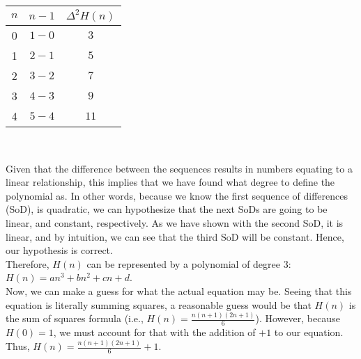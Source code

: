 \documentclass{article}
\begin{document}
\begin{enumerate}
\begin{enumerate}
\begin{multicols}{3}
                \columnbreak
                \begin{center}
                    \begin{tabular}{c|c|c}
                        $n$ & $n-1$ & \(\Delta^2 H(n)\) \\
                        \hline
                        0 & $1-0$ & $3$ \\
                        1 & $2-1$ & $5$ \\
                        2 & $3-2$ & $7$ \\
                        3 & $4-3$ & $9$ \\
                        4 & $5-4$ & $11$ \\
                    \end{tabular} \\
                \end{center}
                
            \end{multicols}

            Given that the difference between the sequences results in numbers equating to a linear relationship, this implies that we have found what degree to define the polynomial as. In other words, because we know the first sequence of differences (SoD), is quadratic, we can hypothesize that the next SoDs are going to be linear, and constant, respectively. As we have shown with the second SoD, it is linear, and by intuition, we can see that the third SoD will be constant. Hence, our hypothesis is correct. \\
            
            Therefore, $H(n)$ can be represented by a polynomial of degree 3: \\ 
            $H(n) = an^3 + bn^2 + cn + d$. \\

            Now, we can make a guess for what the actual equation may be. Seeing that this equation is literally summing squares, a reasonable guess would be that $H(n)$ is the sum of squares formula (i.e., $H(n) = \frac{n(n+1)(2n+1)}{6}$). However, because $H(0) =1$, we must account for that with the addition of $+1$ to our equation. Thus, $H(n) = \frac{n(n+1)(2n+1)}{6} + 1$. \\

\newpage
            

\end{enumerate}
\end{enumerate}
\end{document}
